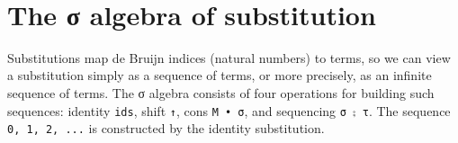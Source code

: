 \begin{fence}
\begin{code}%
\>[0]\AgdaSpace{}%
\AgdaSymbol{:}\AgdaSpace{}%
\AgdaSpace{}%
\AgdaSpace{}%
\AgdaSymbol{\}}\AgdaSpace{}%
\AgdaSpace{}%
\AgdaSpace{}%
\AgdaSpace{}%
\AgdaSpace{}%
\AgdaSpace{}%
\AgdaSpace{}%
\AgdaSpace{}%
\AgdaSpace{}%
\AgdaSpace{}%
\AgdaSpace{}%
\AgdaSpace{}%
\<%
\\
\>[0]\AgdaSpace{}%
\AgdaSpace{}%
\AgdaSpace{}%
\AgdaSymbol{=}\AgdaSpace{}%
\AgdaSpace{}%
\AgdaSpace{}%
\AgdaSpace{}%
\AgdaSpace{}%
\AgdaSpace{}%
\<%
\end{code}
\end{fence}

\hypertarget{the-ux3c3-algebra-of-substitution}{%
\section{The σ algebra of
substitution}\label{the-ux3c3-algebra-of-substitution}}

Substitutions map de Bruijn indices (natural numbers) to terms, so we
can view a substitution simply as a sequence of terms, or more
precisely, as an infinite sequence of terms. The σ algebra consists of
four operations for building such sequences: identity \texttt{ids},
shift \texttt{↑}, cons \texttt{M\ •\ σ}, and sequencing
\texttt{σ\ ⨟\ τ}. The sequence \texttt{0,\ 1,\ 2,\ ...} is constructed
by the identity substitution.

\begin{fence}
\begin{code}%
\>[0]\AgdaSpace{}%
\AgdaSymbol{:}\AgdaSpace{}%
\AgdaSymbol{\}}\AgdaSpace{}%
\AgdaSpace{}%
\AgdaSpace{}%
\AgdaSpace{}%
\<%
\\
\>[0]\AgdaSpace{}%
\AgdaSpace{}%
\AgdaSymbol{=}\AgdaSpace{}%
\AgdaSpace{}%
\<%
\end{code}
\end{fence}

